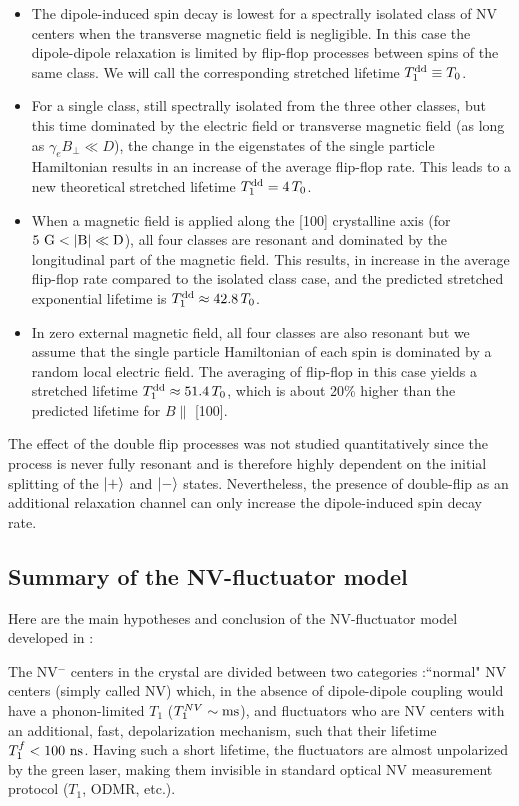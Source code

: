 \documentclass[preprintnumbers,amsmath,amssymb,onecolumn,12pt]{revtex4-2}\usepackage{graphicx}%
\begin{document}
\begin{itemize}
\item The dipole-induced spin decay is lowest for a spectrally isolated class of NV centers when the transverse magnetic field is negligible. In this case the dipole-dipole relaxation is limited by flip-flop processes between spins of the same class. We will call the corresponding stretched lifetime $T_1^{\rm dd}\equiv T_0$.
\item For a single class, still spectrally isolated   from the three other classes, but this time dominated by the electric field or transverse magnetic field (as long as $\gamma_e B_\perp \ll D$), the change in the eigenstates of the single particle Hamiltonian results in an increase of the average flip-flop rate. This leads to a new theoretical stretched lifetime $T_1^{\rm dd}= 4\, T_0$.
\item When a magnetic field is applied along the [100] crystalline axis (for $5\ \rm G < \abs{B} \ll D$), all four classes are resonant and dominated by the longitudinal part of the magnetic field. This results, in increase in the average flip-flop rate compared to the isolated class case, and the predicted stretched exponential lifetime is $T_1^{\rm dd}\approx 42.8\, T_0$.
\item In zero external magnetic field, all four classes are also resonant but we assume that the single particle Hamiltonian of each spin is dominated by a random local electric field. The averaging of flip-flop in this case yields a stretched lifetime $T_1^{\rm dd}\approx 51.4\, T_0$, which is about 20\% higher than the predicted lifetime for $B \parallel$ [100].
\end{itemize}

The effect of the double flip processes was not studied quantitatively since the process is never fully resonant and is therefore highly dependent on the initial splitting of the $\ket{+}$ and $\ket{-} $ states. Nevertheless, the presence of double-flip as an additional relaxation channel can only increase the dipole-induced spin decay rate. 

\subsection{Summary of the NV-fluctuator model}
Here are the main hypotheses and conclusion of the NV-fluctuator model developed in \cite{choi_depolarization_2017} :

The NV$^-$ centers in the crystal are divided between two categories :``normal" NV centers (simply called NV) which, in the absence of dipole-dipole coupling would have a phonon-limited $T_1$ ($T_1^{NV}\sim \rm ms$), and fluctuators who are NV centers with an additional, fast, depolarization mechanism, such that their lifetime $T_1^f < 100\ \rm ns$. Having such a short lifetime, the fluctuators are almost unpolarized by the green laser, making them invisible in standard optical NV measurement protocol ($T_1$, ODMR, etc.). 
\end{document}
